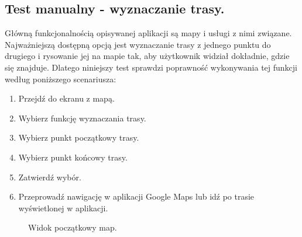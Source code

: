 \subsection*{Test manualny - wyznaczanie trasy.}
Główną funkcjonalnością opisywanej aplikacji są mapy i usługi z nimi związane. Najważniejszą dostępną opcją jest wyznaczanie trasy z jednego punktu do drugiego i rysowanie jej na mapie tak, aby użytkownik widział dokładnie, gdzie się znajduje. Dlatego niniejszy test sprawdzi poprawność wykonywania tej funkcji według poniższego scenariusza:
\begin{enumerate}
    \item Przejdź do ekranu z mapą.
    \item Wybierz funkcję wyznaczania trasy.
    \item Wybierz punkt początkowy trasy.
    \item Wybierz punkt końcowy trasy.
    \item Zatwierdź wybór.
    \item Przeprowadź nawigację w aplikacji Google Maps lub idź po trasie wyświetlonej w aplikacji.
\end{enumerate}

\setlength{\fboxrule}{0.5pt}
\begin{figure}[H]
    \centering
    \caption{Widok początkowy map.}
    \label{test:map1}
\end{figure}

